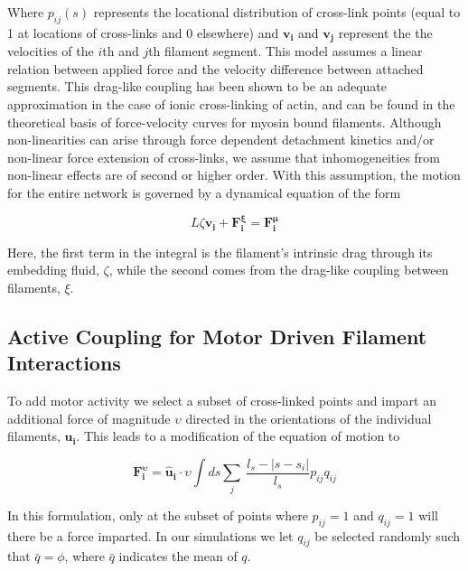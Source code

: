 \documentclass[10pt,letterpaper]{article}
\begin{document}
Where $p_{ij}(s)$ represents the locational distribution of cross-link points (equal to 1 at locations of cross-links and 0 elsewhere) and $\mathbf{v_i}$ and $\mathbf{v_j}$ represent the the velocities of the $i$th and $j$th filament segment.  This model assumes a linear relation between applied force and the velocity difference between attached segments.  This drag-like coupling has been shown to be an adequate approximation in the case of ionic cross-linking of actin\cite{mol_fric,theo_hydroish2}, and can be found in the theoretical basis of force-velocity curves for myosin bound filaments\cite{theo_frictionShila}. Although non-linearities can arise through force dependent detachment kinetics and/or non-linear force extension of cross-links, we assume that inhomogeneities from non-linear effects are of second or higher order. With this assumption, the motion for the entire network is governed by a dynamical equation of the form

\begin{equation}
\label{eqn:syst}
L\zeta\mathbf{ v_i} +\mathbf{F^{\xi}_i}= \mathbf{F^{\mu}_i}
\end{equation}

Here, the first term in the integral is the filament's intrinsic drag through its embedding fluid, $\zeta$, while the second comes from the drag-like coupling between filaments, $\xi$.  

\subsection*{Active Coupling for Motor Driven Filament Interactions}

To add motor activity we select a subset of cross-linked points and impart an additional force of magnitude $\upsilon$ directed in the orientations of the individual filaments, $\mathbf{u_i}$.  This leads to a modification of the equation of motion to

\begin{equation}
\label{eqn:syst}
\mathbf{F^{\upsilon}_i}= \mathbf{\hat{u}_i}\cdot\upsilon\int ds \sum _j \:  \frac{l_s-|s-s_i|}{l_s} p_{ij}q_{ij}
\end{equation}



In this formulation, only at the subset of points where  $p_{ij}=1$ and $q_{ij}=1$ will there be a force imparted.  In our simulations we let $q_{ij}$ be selected randomly such that $\bar{q}=\phi$, where $\bar{q}$ indicates the mean of $q$.
\end{document}
